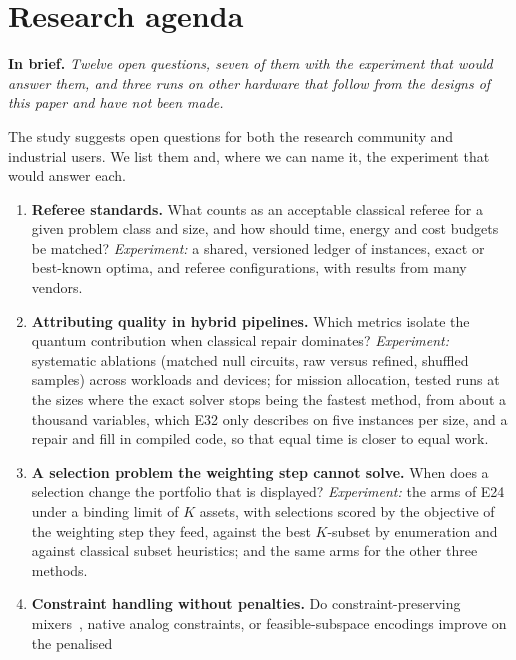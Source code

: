 \documentclass[11pt,a4paper]{article}
\newcommand{\inbrief}[1]{\par\smallskip\noindent\textbf{In brief.} \emph{#1}\par\medskip}
\begin{document}
\section{Research agenda}
\label{sec:agenda}

\inbrief{Twelve open questions, seven of them with the experiment that would
answer them, and three runs on other hardware that follow from the designs
of this paper and have not been made.}

The study suggests open questions for both the research community and
industrial users. We list them and, where we can name it, the experiment
that would answer each.

\begin{enumerate}
  \item \textbf{Referee standards.} What counts as an acceptable classical
        referee for a given problem class and size, and how should time,
        energy and cost budgets be matched? \emph{Experiment:} a shared,
        versioned ledger of instances, exact or best-known optima, and
        referee configurations, with results from many vendors.
  \item \textbf{Attributing quality in hybrid pipelines.} Which metrics
        isolate the quantum contribution when classical repair dominates?
        \emph{Experiment:} systematic ablations (matched null circuits, raw
        versus refined, shuffled samples) across workloads and devices; for
        mission allocation, tested runs at the sizes where the exact solver
        stops being the fastest method, from about a thousand variables,
        which E32 only describes on five instances per size, and a repair
        and fill in compiled code, so that equal time is closer to equal
        work.
  \item \textbf{A selection problem the weighting step cannot solve.} When
        does a selection change the portfolio that is displayed?
        \emph{Experiment:} the arms of E24 under a binding limit of $K$
        assets, with selections scored by the objective of the weighting
        step they feed, against the best $K$-subset by enumeration and
        against classical subset heuristics; and the same arms for the
        other three methods.
  \item \textbf{Constraint handling without penalties.} Do
        constraint-preserving mixers~\cite{hadfield2019}, native analog
        constraints, or feasible-subspace encodings improve on the penalised

\end{enumerate}
\end{document}
